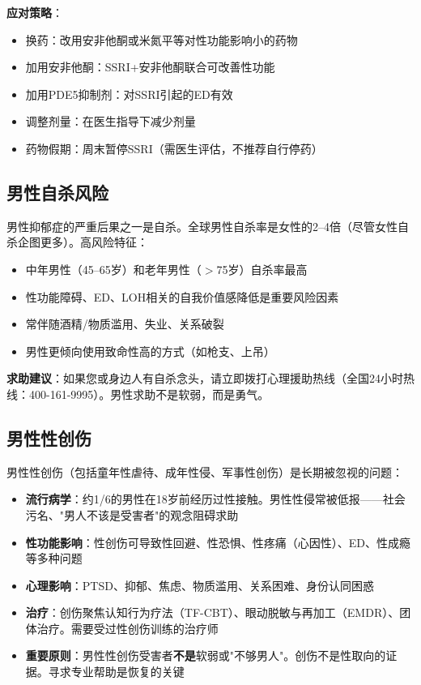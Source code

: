 \textbf{应对策略}：
\begin{itemize}[leftmargin=2cm]
	\item 换药：改用安非他酮或米氮平等对性功能影响小的药物
	\item 加用安非他酮：SSRI+安非他酮联合可改善性功能
	\item 加用PDE5抑制剂：对SSRI引起的ED有效
	\item 调整剂量：在医生指导下减少剂量
	\item 药物假期：周末暂停SSRI（需医生评估，不推荐自行停药）
\end{itemize}

\subsection{男性自杀风险}

男性抑郁症的严重后果之一是自杀。全球男性自杀率是女性的2--4倍（尽管女性自杀企图更多）。高风险特征：

\begin{itemize}[leftmargin=2cm]
	\item 中年男性（45--65岁）和老年男性（$>$75岁）自杀率最高
	\item 性功能障碍、ED、LOH相关的自我价值感降低是重要风险因素
	\item 常伴随酒精/物质滥用、失业、关系破裂
	\item 男性更倾向使用致命性高的方式（如枪支、上吊）
\end{itemize}

\textbf{求助建议}：如果您或身边人有自杀念头，请立即拨打心理援助热线（全国24小时热线：400-161-9995）。男性求助不是软弱，而是勇气。

\subsection{男性性创伤}

男性性创伤（包括童年性虐待、成年性侵、军事性创伤）是长期被忽视的问题：

\begin{itemize}[leftmargin=2cm]
	\item \textbf{流行病学}：约1/6的男性在18岁前经历过性接触。男性性侵常被低报——社会污名、"男人不该是受害者"的观念阻碍求助
	\item \textbf{性功能影响}：性创伤可导致性回避、性恐惧、性疼痛（心因性）、ED、性成瘾等多种问题
	\item \textbf{心理影响}：PTSD、抑郁、焦虑、物质滥用、关系困难、身份认同困惑
	\item \textbf{治疗}：创伤聚焦认知行为疗法（TF-CBT）、眼动脱敏与再加工（EMDR）、团体治疗。需要受过性创伤训练的治疗师
	\item \textbf{重要原则}：男性性创伤受害者\textbf{不是}软弱或"不够男人"。创伤不是性取向的证据。寻求专业帮助是恢复的关键
\end{itemize}

